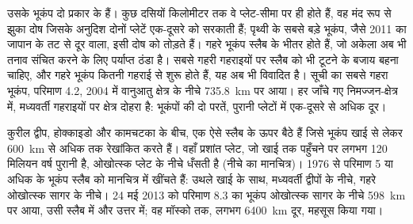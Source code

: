 उसके भूकंप दो प्रकार के हैं। कुछ दसियों किलोमीटर तक वे प्लेट-सीमा पर ही होते हैं, वह मंद रूप से झुका दोष जिसके अनुदिश दोनों प्लेटें एक-दूसरे को सरकाती हैं; पृथ्वी के सबसे बड़े भूकंप, जैसे 2011 का जापान के तट से दूर वाला, इसी दोष को तोड़ते हैं। गहरे भूकंप स्लैब के भीतर होते हैं, जो अकेला अब भी तनाव संचित करने के लिए पर्याप्त ठंडा है। सबसे गहरी गहराइयों पर स्लैब को भी टूटने के बजाय बहना चाहिए, और गहरे भूकंप कितनी गहराई से शुरू होते हैं, यह अब भी विवादित है। सूची का सबसे गहरा भूकंप, परिमाण 4.2, 2004 में वानुआतु क्षेत्र के नीचे \qty{735.8}{km} पर आया। हर जाँचे गए निमज्जन-क्षेत्र में, मध्यवर्ती गहराइयों पर क्षेत्र दोहरा है: भूकंपों की दो परतें, पुरानी प्लेटों में एक-दूसरे से अधिक दूर।

कुरील द्वीप, होक्काइडो और कामचटका के बीच, एक ऐसे स्लैब के ऊपर बैठे हैं जिसे भूकंप खाई से लेकर \qty{600}{km} से अधिक तक रेखांकित करते हैं। वहाँ प्रशांत प्लेट, जो खाई तक पहुँचने पर लगभग 120 मिलियन वर्ष पुरानी है, ओखोत्स्क प्लेट के नीचे धँसती है (नीचे का मानचित्र)। 1976 से परिमाण 5 या अधिक के भूकंप स्लैब को मानचित्र में खींचते हैं: उथले खाई के साथ, मध्यवर्ती द्वीपों के नीचे, गहरे ओखोत्स्क सागर के नीचे। 24 मई 2013 को परिमाण 8.3 का भूकंप ओखोत्स्क सागर के नीचे \qty{598}{km} पर आया, उसी स्लैब में और उत्तर में; वह मॉस्को तक, लगभग \qty{6400}{km} दूर, महसूस किया गया।

